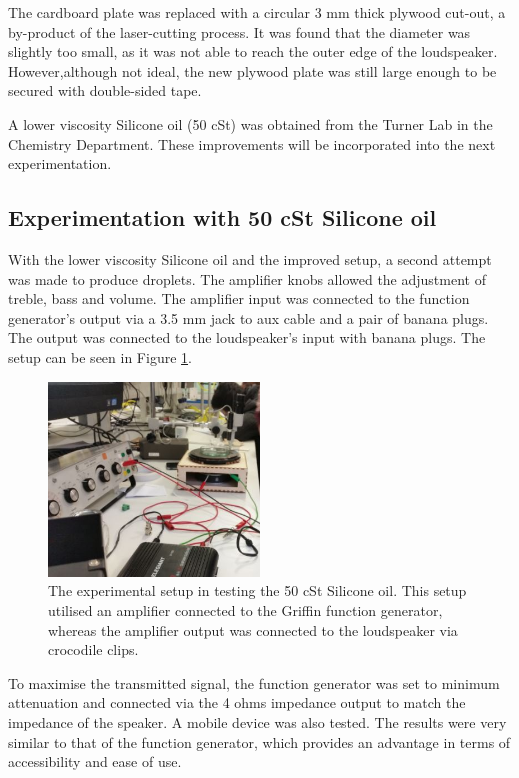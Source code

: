 The cardboard plate was replaced with a circular 3 mm thick plywood cut-out, a by-product of the laser-cutting process. It was found that the diameter was slightly too small, as it was not able to reach the outer edge of the loudspeaker. However,although not ideal, the new plywood plate was still large enough to be secured with double-sided tape. 

A lower viscosity Silicone oil (50 cSt) was obtained from the Turner Lab in the Chemistry Department. These improvements will be incorporated into the next experimentation.

\subsection{Experimentation with 50 cSt Silicone oil}
With the lower viscosity Silicone oil and the improved setup, a second attempt was made to produce droplets. The amplifier knobs allowed the adjustment of treble, bass and volume. The amplifier input was connected to the function generator's output via a 3.5 mm jack to aux cable and a pair of banana plugs. The output was connected to the loudspeaker's input with banana plugs. The setup can be seen in Figure \ref{fig:exp_setup_sideshot}.

\begin{figure}[ht]
\includegraphics[width=0.5\textwidth]{prototype/exp_rep_imgs/exp_setup_sideshot.jpg}
\centering
\caption{The experimental setup in testing the 50 cSt Silicone oil. This setup utilised an amplifier connected to the Griffin function generator, whereas the amplifier output was connected to the loudspeaker via crocodile clips.  }
\centering
\label{fig:exp_setup_sideshot}
\end{figure}

To maximise the transmitted signal, the function generator was set to minimum attenuation and connected via the 4 ohms impedance output to match the impedance of the speaker. A mobile device was also tested. The results were very similar to that of the function generator, which provides an advantage in terms of accessibility and ease of use.

